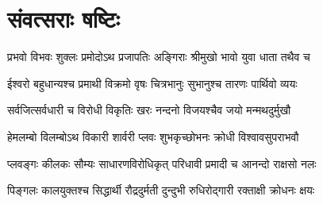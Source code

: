 \newcommand{\dngfamily}{\fontspec[Script=Devanagari,Scale=1,AutoFakeBold=2]{Sanskrit 2003}}
\newcommand{\tamfamily}{\fontspec[Script=Tamil,FakeStretch=0.9]{Noto Sans Tamil}}
\newcommand{\tam}[1]{%
{\fontspec[Script=Tamil,FakeStretch=0.9]{Noto Sans Tamil}  #1}}
\setlength{\columnseprule}{0pt}
\renewcommand{\labelenumi}{\devanumber\theenumi.}
\section*{संवत्सराः षष्टिः}
\twolineshloka
{प्रभवो विभवः शुक्लः प्रमोदोऽथ प्रजापतिः}
{अङ्गिराः श्रीमुखो भावो युवा धाता तथैव च}

\twolineshloka
{ईश्वरो बहुधान्यश्च प्रमाथी विक्रमो वृषः}
{चित्रभानुः सुभानुश्च तारणः पार्थिवो व्ययः}

\twolineshloka
{सर्वजित्सर्वधारी च विरोधी विकृतिः खरः}
{नन्दनो विजयश्चैव जयो मन्मथदुर्मुखौ}

\twolineshloka
{हेमलम्बो विलम्बोऽथ विकारी शार्वरी प्लवः}
{शुभकृच्छोभनः क्रोधी विश्वावसुपराभवौ}

\twolineshloka
{प्लवङ्गः कीलकः सौम्यः साधारणविरोधिकृत्}
{परिधावी प्रमादी च आनन्दो राक्षसो नलः}

\twolineshloka
{पिङ्गलः कालयुक्तश्च सिद्धार्थी रौद्रदुर्मती}
{दुन्दुभी रुधिरोद्गारी रक्ताक्षी क्रोधनः क्षयः}


